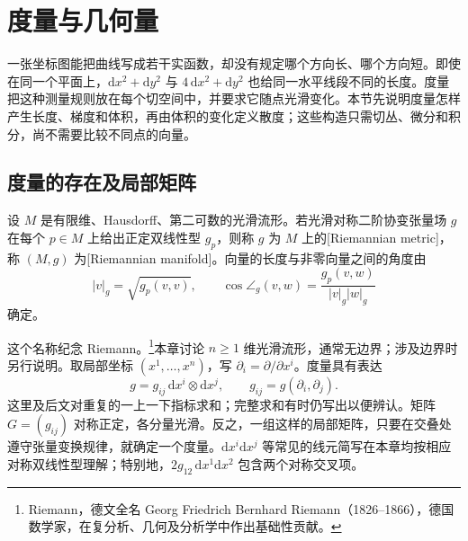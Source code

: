 
% 
% 

\section{度量与几何量}
\label{g3:sec:0101}

一张坐标图能把曲线写成若干实函数，却没有规定哪个方向长、哪个方向短。即使在同一个平面上，\(\mathrm{d}x^2+\mathrm{d}y^2\) 与 \(4\,\mathrm{d}x^2+\mathrm{d}y^2\) 也给同一水平线段不同的长度。度量把这种测量规则放在每个切空间中，并要求它随点光滑变化。本节先说明度量怎样产生长度、梯度和体积，再由体积的变化定义散度；这些构造只需切丛、微分和积分，尚不需要比较不同点的向量。

\subsection{度量的存在及局部矩阵}
\label{g3:subsec:0101:01}

\begin{definition}
	\label{g3:def:riemannian-metric}
	设 \(M\) 是有限维、Hausdorff、第二可数的光滑流形。若光滑对称二阶协变张量场 \(g\) 在每个 \(p\in M\) 上给出正定双线性型 \(g_p\)，则称 \(g\) 为 \(M\) 上的[Riemannian metric]，称 \((M,g)\) 为[Riemannian manifold]。向量的长度与非零向量之间的角度由
	\[
		|v|_g=\sqrt{g_p(v,v)},\qquad
		\cos\angle_g(v,w)=\frac{g_p(v,w)}{|v|_g|w|_g}
	\]
	确定。
\end{definition}

这个名称纪念 Riemann。\footnote{Riemann，德文全名 Georg Friedrich Bernhard Riemann（1826--1866），德国数学家，在复分析、几何及分析学中作出基础性贡献。}本章讨论 \(n\geq1\) 维光滑流形，通常无边界；涉及边界时另行说明。取局部坐标 \((x^1,\ldots,x^n)\)，写 \(\partial_i=\partial/\partial x^i\)。度量具有表达
\begin{equation}
	\label{g3:eq:metric-local-matrix}
	g=g_{ij}\,\mathrm{d}x^i\otimes\mathrm{d}x^j,\qquad
	g_{ij}=g(\partial_i,\partial_j).
\end{equation}
这里及后文对重复的一上一下指标求和；完整求和有时仍写出以便辨认。矩阵 \(G=(g_{ij})\) 对称正定，各分量光滑。反之，一组这样的局部矩阵，只要在交叠处遵守张量变换规律，就确定一个度量。\(\mathrm{d}x^i\mathrm{d}x^j\) 等常见的线元简写在本章均按相应对称双线性型理解；特别地，\(2g_{12}\,\mathrm{d}x^1\mathrm{d}x^2\) 包含两个对称交叉项。

